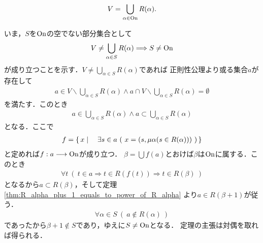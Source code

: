 	\begin{screen}
		\begin{thm}\label{thm:Universe_and_ordinal_numbers}
			\begin{align}
				V = \bigcup_{\alpha \in \mathrm{On}} R(\alpha).
			\end{align}
		\end{thm}
	\end{screen}
	
	\begin{prf}
		いま，$S$を$\mathrm{On}$の空でない部分集合として
		\begin{align}
			V \neq \bigcup_{\alpha \in S} R(\alpha)
			\Longrightarrow S \neq \mathrm{On}
		\end{align}
		が成り立つことを示す．$V \neq \bigcup_{\alpha \in S} R(\alpha)$であれば
		正則性公理より或る集合$a$が存在して
		\begin{align}
			a \in V \backslash \bigcup_{\alpha \in S} R(\alpha)
			\wedge a \cap V \backslash \bigcup_{\alpha \in S} R(\alpha) = \emptyset
		\end{align}
		を満たす．このとき
		\begin{align}
			a \in \bigcup_{\alpha \in S} R(\alpha) \wedge a \subset \bigcup_{\alpha \in S} R(\alpha)
		\end{align}
		となる．ここで
		\begin{align}
			f = \left\{\, x \mid \quad \exists s \in a\ (\ x = (s,\mu \alpha (s \in R(\alpha)))\ )\, \right\}
		\end{align}
		と定めれば$f:a \longrightarrow \mathrm{On}$が成り立つ．
		$\beta = \bigcup f(a)$とおけば$\beta$は$\mathrm{On}$に属する．このとき
		\begin{align}
			\forall t\ (\ t \in a \Longrightarrow t \in R(f(t))
			\Longrightarrow t \in R(\beta)\ )
		\end{align}
		となるから$a \subset R(\beta)$，そして定理\ref{thm:R_alpha_plus_1_equals_to_power_of_R_alpha}
		より$a \in R(\beta + 1)$が従う．
		\begin{align}
			\forall \alpha \in S\ (\ a \notin R(\alpha)\ )
		\end{align}
		であったから$\beta + 1 \notin S$であり，ゆえに$S \neq \mathrm{On}$となる．
		定理の主張は対偶を取れば得られる．
		\QED
	\end{prf}
	
	
